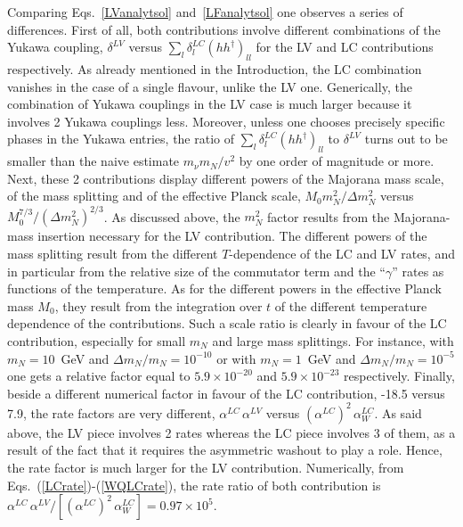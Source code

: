 \documentclass[prd,twocolumn,superscriptaddress,preprintnumbers,nofootinbib,
noshowpacs,groupedaddress]{revtex4-1} %
\begin{document}
Comparing Eqs.~\eqref{LVanalytsol} and~\eqref{LFanalytsol} one observes a series of differences.
First of all, both contributions involve different combinations of the Yukawa coupling, $\delta^{LV}$ versus $\sum_l \delta_l^{LC} (h h^\dag)_{ll}$ for the LV and LC contributions respectively. As already mentioned in the Introduction, the LC combination vanishes in the case of a single flavour, unlike the LV one. Generically, the combination of Yukawa couplings in the LV case is much larger because it involves 2 Yukawa couplings less.  Moreover, unless one chooses precisely specific phases in the Yukawa entries, 
the ratio of $\sum_l \delta_l^{LC} (h h^\dag)_{ll}$ to $\delta^{LV}$ turns out to be smaller than the naive estimate $m_\nu m_N/v^2$ by one order of magnitude or more.
Next, these 2 contributions display different powers of the Majorana mass scale, of the mass splitting and of the  effective Planck scale, $M_0 m_N^2/\Delta m_N^2$ versus $M_0^{7/3}/ (\Delta m_N^2)^{2/3}$. As discussed above, the $m_N^2$ factor results from the Majorana-mass insertion necessary for the LV contribution. The different powers of the mass splitting result from the different $T$-dependence of the LC and LV rates, and in particular from the relative size of the commutator term and the ``$\gamma$'' rates as functions of the temperature.  As for the different powers in the effective Planck mass $M_0$, they result from the integration over $t$ of the different temperature dependence of the contributions. Such a scale ratio is clearly in favour of the LC contribution, especially for small $m_N$ and large mass splittings. For instance, with $m_N=10$~GeV and $\Delta m_N/m_N=10^{-10}$ or with $m_N=1$~GeV and $\Delta m_N/m_N=10^{-5}$ one gets a relative factor equal to 
$5.9 \times 10^{-20}$
and $5.9 \times 10^{-23}$ respectively.
Finally, beside a different numerical factor in favour of the LC contribution, -18.5 versus 7.9, the rate factors are very different, $\alpha^{LC} \, \alpha^{LV} $ versus $ (\alpha^{LC})^2 \, \alpha^{LC}_W$. As said above, the LV piece involves 2 rates whereas the LC piece involves 3 of them, as a result of the fact that it requires the asymmetric washout to play a role. Hence, the rate factor is much larger for the LV contribution. Numerically, from Eqs.~(\ref{LCrate})-(\ref{WQLCrate}), the rate ratio of both contribution is
$\alpha^{LC} \, \alpha^{LV}/  [(\alpha^{LC})^2 \, \alpha^{LC}_W]=0.97\times 10^5$.
\end{document}
